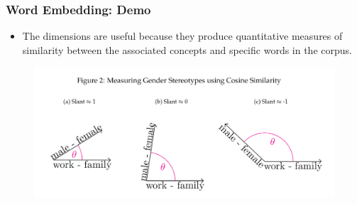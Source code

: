 \documentclass[
  shownotes,
  xcolor={svgnames},
  hyperref={colorlinks,citecolor=DarkBlue,linkcolor=DarkRed,urlcolor=DarkBlue}
  , aspectratio=169]{beamer}
\begin{document}
\begin{frame}[fragile]
\frametitle{Word Embedding: Demo }

\begin{itemize}
  \item  The dimensions are useful because they produce quantitative measures of similarity between the associated concepts and specific words in the corpus. 
  \end{itemize}

   \begin{figure}[H] \centering
            \captionsetup{justification=centering}
              \includegraphics[scale=0.4]{figures/gender_slant.png}
              
 \end{figure}
\end{frame}
\end{document}
